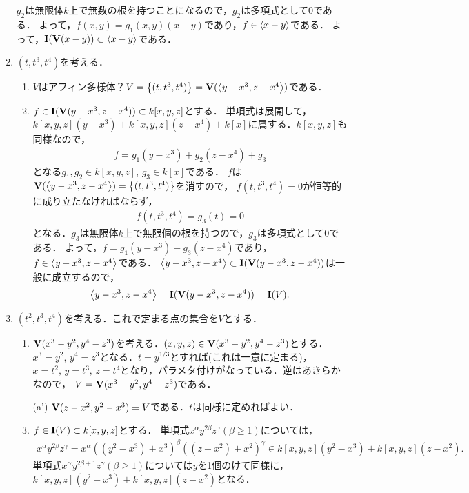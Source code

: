 \documentclass[9pt]{ltjsarticle}
\begin{document}
\begin{enumerate}[label=(問題\arabic*)]
$g_2$は無限体$k$上で無数の根を持つことになるので，$g_2$は多項式として0である．
よって，$f(x,y)=g_1(x,y)(x-y)$であり，$f\in \left\langle x-y \right\rangle$である．
よって，$\textbf I(\textbf V(x-y))\subset \left\langle x-y \right\rangle$である．
 \item $(t,t^3,t^4)$を考える．
\begin{enumerate}[label=(\alph*)]
 \item $V$はアフィン多様体？$V=\left\{(t,t^3,t^4)\right\}  = \textbf V(\left\langle y-x^3,z-x^4 \right\rangle)$である．
 \item $f\in \textbf I(\textbf V(y-x^3,z-x^4))\subset k[x,y,z]$とする．
単項式は展開して，$k[x,y,z](y-x^3) + k[x,y,z](z-x^4) + k[x]$に属する．$k[x,y,z]$も同様なので，
\begin{align}
 f = g_1(y-x^3) + g_2(z-x^4) + g_3
\end{align}
となる$g_1,g_2 \in k[x,y,z],\, g_3 \in k[x]$である．
$f$は$\textbf V(\left\langle y-x^3,z-x^4 \right\rangle)=\left\{(t,t^3,t^4)\right\}$を消すので，
$f(t,t^3,t^4)=0$が恒等的に成り立たなければならず，
\begin{align}
 f(t,t^3,t^4) = g_3(t) = 0
\end{align}
となる．$g_3$は無限体$k$上で無限個の根を持つので，$g_3$は多項式として0である．
よって，$f = g_1(y-x^3)+ g_3(z-x^4)$であり，$f\in \left\langle y-x^3,z-x^4 \right\rangle$である．
$\left\langle y-x^3,z-x^4 \right\rangle\subset \textbf I(\textbf V(y-x^3,z-x^4))$は一般に成立するので，
\begin{align}
 \left\langle y-x^3,z-x^4 \right\rangle = \textbf I(\textbf V(y-x^3,z-x^4)) = \textbf I(V).
\end{align}
\end{enumerate}
 \item $(t^2,t^3,t^4)$を考える．これで定まる点の集合を$V$とする．
\begin{enumerate}[label=(\alph*)]
 \item $\textbf V(x^3-y^2,y^4-z^3)$を考える．$(x,y,z)\in \textbf V(x^3-y^2,y^4-z^3)$とする．$x^3=y^2,\, y^4=z^3$となる．$t=y^{1/3}$とすれば(これは一意に定まる)，$x=t^2,\,y=t^3,\, z=t^4$となり，パラメタ付けがなっている．逆はあきらかなので，
$V = \textbf V(x^3-y^2,y^4-z^3)$である．
 \item[(a')] $\textbf V(z-x^2,y^2-x^3)=V$である．$t$は同様に定めればよい．
 \item $f\in \textbf I(V) \subset k[x,y,z]$とする．
単項式$x^\alpha y^{2\beta} z^\gamma(\beta \ge 1)$については，
\begin{align}
 x^\alpha y^{2\beta}z^\gamma = x^\alpha ((y^2-x^3)+x^3)^\beta ((z-x^2)+x^2)^\gamma \in k[x,y,z](y^2-x^3) + k[x,y,z](z-x^2).
\end{align}
単項式$x^\alpha y^{2\beta + 1}z^\gamma (\beta \ge 1)$については$y$を1個のけて同様に，$k[x,y,z](y^2-x^3) + k[x,y,z](z-x^2)$となる．

\end{enumerate}
\end{enumerate}
\end{document}
